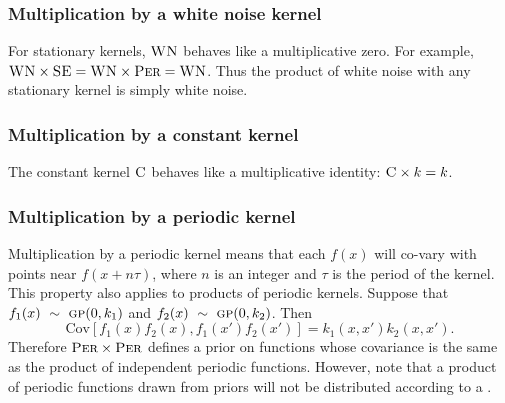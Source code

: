 \documentclass{article} %
\def\ie{i.e.\ }
\begin{document}

\subsubsection{Multiplication by a white noise kernel}
\vspace{-0.08in}

For stationary kernels, ${\textsc{WN}}$ behaves like a multiplicative zero.
For example, ${\textsc{WN}} \times {\textsc{SE}} = {\textsc{WN}} \times {\textsc{Per}} = {\textsc{WN}}$.
Thus the product of white noise with any stationary kernel is simply white noise.


\subsubsection{Multiplication by a constant kernel}
\vspace{-0.08in}

The constant kernel ${\textsc{C}}$ behaves like a multiplicative identity: ${\textsc{C}} \times k = k$.


\subsubsection{Multiplication by a periodic kernel}
\vspace{-0.08in}

Multiplication by a periodic kernel means that each $f(x)$ will co-vary with points near $f(x + n \tau)$, where $n$ is an integer and $\tau$ is the period of the kernel.
%
This property also applies to products of periodic kernels.
Suppose that ${f_1(x) \ \sim\  {\textsc{gp}}{}(0, k_1)}$ and ${f_2(x) \ \sim\  {\textsc{gp}}{}(0, k_2)}$.
Then
\begin{equation}
{\textrm{Cov} \left[f_1(x)f_2(x), f_1(x')f_2(x') \right] = k_1(x,x')k_2(x,x')}.
\end{equation}
Therefore ${\textsc{Per}} \times {\textsc{Per}}$ defines a prior on functions whose covariance is the same as the product of independent periodic functions.  However, note that a product of periodic functions drawn from \gp{} priors will not be distributed according to a \gp{}.
\end{document}
